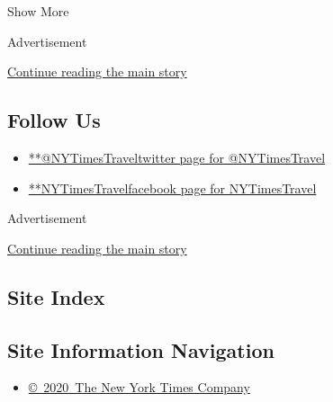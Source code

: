 Show More

Advertisement

\protect\hyperlink{after-mid3}{Continue reading the main story}

\hypertarget{follow-us}{%
\subsection{Follow Us}\label{follow-us}}

\begin{itemize}
\tightlist
\item
  \href{https://twitter.com/NYTimesTravel}{**@NYTimesTraveltwitter page
  for @NYTimesTravel}
\item
  \href{https://www.facebook.com/NYTimesTravel}{**NYTimesTravelfacebook
  page for NYTimesTravel}
\end{itemize}

Advertisement

\protect\hyperlink{after-mktg}{Continue reading the main story}

\hypertarget{site-index}{%
\subsection{Site Index}\label{site-index}}

\hypertarget{site-information-navigation}{%
\subsection{Site Information
Navigation}\label{site-information-navigation}}

\begin{itemize}
\tightlist
\item
  \href{https://help.nytimes.com/hc/en-us/articles/115014792127-Copyright-notice}{©~2020~The
  New York Times Company}
\end{itemize}

